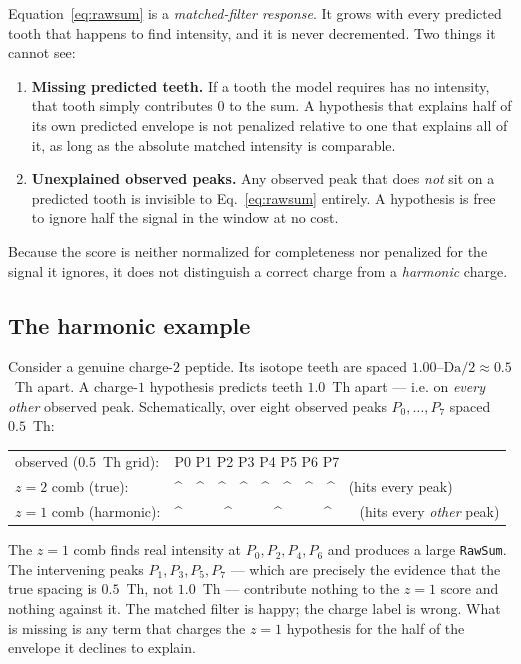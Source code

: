 \documentclass[11pt]{article}
\begin{document}
Equation~\eqref{eq:rawsum} is a \emph{matched-filter response}. It grows with every
predicted tooth that happens to find intensity, and it is never decremented. Two
things it cannot see:
\begin{enumerate}[label=(\alph*)]
  \item \textbf{Missing predicted teeth.} If a tooth the model requires has no
  intensity, that tooth simply contributes $0$ to the sum. A hypothesis that
  explains half of its own predicted envelope is not penalized relative to one that
  explains all of it, as long as the absolute matched intensity is comparable.
  \item \textbf{Unexplained observed peaks.} Any observed peak that does \emph{not}
  sit on a predicted tooth is invisible to Eq.~\eqref{eq:rawsum} entirely. A
  hypothesis is free to ignore half the signal in the window at no cost.
\end{enumerate}
Because the score is neither normalized for completeness nor penalized for the
signal it ignores, it does not distinguish a correct charge from a \emph{harmonic}
charge.

\subsection{The harmonic example}

Consider a genuine charge-$2$ peptide. Its isotope teeth are spaced
$1.00\text{--}\mathrm{Da}/2 \approx 0.5$~Th apart. A charge-$1$ hypothesis predicts
teeth $1.0$~Th apart --- i.e. on \emph{every other} observed peak. Schematically,
over eight observed peaks $P_0,\dots,P_7$ spaced $0.5$~Th:

\begin{center}
\ttfamily
\begin{tabular}{l l}
observed ($0.5$~Th grid): & P0  P1  P2  P3  P4  P5  P6  P7 \\
$z{=}2$ comb (true):      & \^{}\ \ \^{}\ \ \^{}\ \ \^{}\ \ \^{}\ \ \^{}\ \ \^{}\ \ \^{}\ \ (hits every peak) \\
$z{=}1$ comb (harmonic):  & \^{}\ \ \ \ \ \ \^{}\ \ \ \ \ \ \^{}\ \ \ \ \ \ \^{}\ \ \ \ (hits every \emph{other} peak) \\
\end{tabular}
\end{center}

The $z{=}1$ comb finds real intensity at $P_0, P_2, P_4, P_6$ and produces a large
\texttt{RawSum}. The intervening peaks $P_1, P_3, P_5, P_7$ --- which are precisely
the evidence that the true spacing is $0.5$~Th, not $1.0$~Th --- contribute nothing
to the $z{=}1$ score and nothing against it. The matched filter is happy; the charge
label is wrong. What is missing is any term that charges the $z{=}1$ hypothesis for
the half of the envelope it declines to explain.
\end{document}
